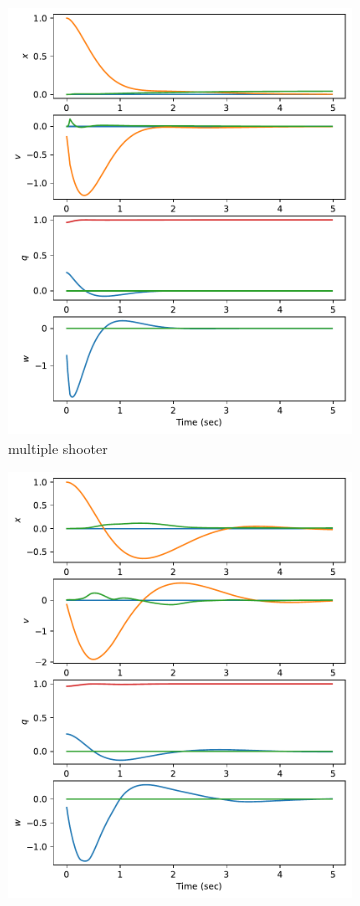 \documentclass[]{article}
\begin{document}
\begin{figure}[H]
\begin{subfigure}[b]{0.3\textwidth}
		\includegraphics[width=\textwidth]{figures/statey115dx3.pdf}
		\caption{multiple shooter}
	\end{subfigure}
	\begin{subfigure}[b]{0.3\textwidth}
		\centering
		\includegraphics[width=\textwidth]{figures/statey115dx2.pdf}

\end{subfigure}
\end{figure}
\end{document}
